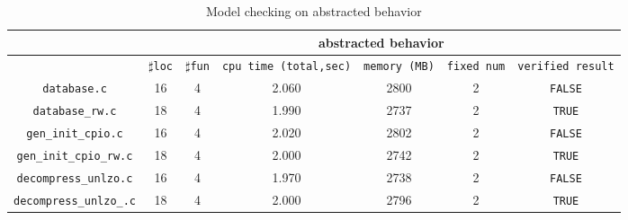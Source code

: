 \begin{table}
  \scriptsize
\begin{tabular}{|c|c|c|c|c|c|c|}
\hline
&\multicolumn{6}{|c|}{abstracted behavior} \\
\hline
 &$\sharp$\texttt{loc} & $\sharp$\texttt{fun} & \texttt{cpu time (total,sec)} & \texttt{memory (MB)} & \texttt{fixed num} & \texttt{verified result} \\
\hline
\texttt{database.c} &  16 & 4 & 2.060 & 2800 & 2 & \texttt{FALSE} \\
\hline
\texttt{database\_rw.c} &  18 & 4 & 1.990 & 2737 & 2 & \texttt{TRUE} \\
\hline
\texttt{gen\_init\_cpio.c} & 16 & 4 & 2.020 & 2802 & 2  & \texttt{FALSE}  \\
\hline
\texttt{gen\_init\_cpio\_rw.c} & 18 & 4 & 2.000  & 2742  & 2  & \texttt{TRUE}  \\
\hline
\texttt{decompress\_unlzo.c} & 16 & 4 & 1.970  & 2738  & 2  & \texttt{FALSE}  \\
\hline
\texttt{decompress\_unlzo\_.c} & 18 & 4  & 2.000  & 2796  & 2  & \texttt{TRUE}  \\

\hline
\end{tabular}
\caption{Model checking on abstracted behavior}
\label{tb:mca}
\end{table}



